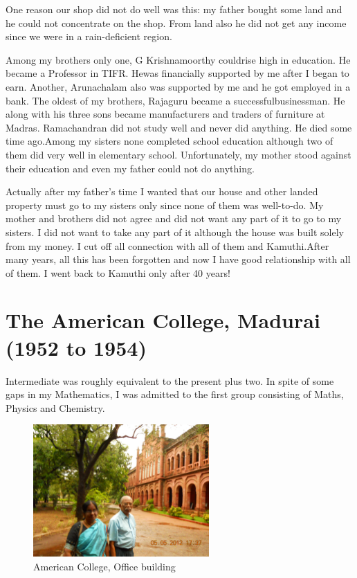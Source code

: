 One reason our shop did not do well was this: my father bought some land 
and he could not concentrate on the shop. From land also he did not get 
any income since we were in a rain-deficient region.

Among my brothers only one, G Krishnamoorthy could\break rise high in 
education. He became a Professor in TIFR. He\break was financially supported 
by me after I began to earn. Another, Arunachalam also was supported by 
me and he got employed in a bank. The oldest of my brothers, Rajaguru 
became a successful\break businessman. He along with his three sons became 
manufactu\-rers and traders of furniture at Madras. Ramachandran did not 
study well and never did anything. He died some time ago.\break Among my 
sisters none completed school education although two of them did very 
well in elementary school. Unfortunately, my mother stood against their 
education and even my father could not do anything.

Actually after my father's time I wanted that our house and other landed 
property must go to my sisters only since none of them was well-to-do.  
My mother and brothers did not agree and did not want any part of it to 
go to my sisters. I did not want to take any part of it although the 
house was built solely from my money. I cut off all connection with all 
of them and Kamuthi.\break After many years, all this has been forgotten and 
now I have good relationship with all of them. I went back to Kamuthi 
only after 40 years!

\vspace{-\topsep}
\section*{The American College, Madurai (1952 to 1954)}
\vspace{-\topsep}
Intermediate was roughly equivalent to the present plus two. In spite of 
some gaps in my Mathematics, I was admitted to the first group 
consisting of Maths, Physics and Chemistry.

\vspace{-\topsep}
\begin{figure}[H]
\centering
\includegraphics[width=0.6\textwidth]{images/new-images/05-Rajaji-AC.jpg}
\caption{\small{American College, Office building}}
\end{figure}
\vspace{-\topsep}
\newpage

